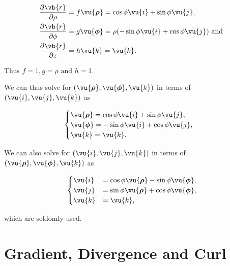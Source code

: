 \documentclass[english,a4paper,12pt]{report}
\begin{document}
\begin{equation}
	\begin{aligned} 
		\frac{\partial \vb{r} }{\partial \rho }  &= f \vu{\boldsymbol{\rho } } = \cos{\phi}\vu{i} + \sin{\phi}\vu{j}, \\
		\frac{\partial \vb{r} }{\partial \phi }  &= g \vu{\boldsymbol{\phi } } = \rho (-\sin{\phi}\vu{i} + \cos{\phi}\vu{j}) \text { and }  \\
		\frac{\partial \vb{r} }{\partial z }  &= h \vu{k} = \vu{k}. 
	\end{aligned} 
\end{equation}

Thus \(f = 1, g = \rho  \text { and }  h = 1\). 

We can thus solve for \((\vu{\boldsymbol{\rho } }, \vu{\boldsymbol{\phi } }, \vu{k} )\) in terms of \((\vu{i} ,\vu{j} ,\vu{k} )\) as

\begin{equation}
    \begin{cases} 
        \vu{\boldsymbol{\rho } } = \cos \phi \vu{i} + \sin \phi \vu{j}, \\
        \vu{\boldsymbol{\phi } } = -\sin \phi \vu{i} + \cos \phi \vu{j}, \\
        \vu{k} = \vu{k}.
        \end{cases}
\end{equation}



We can also solve for \((\vu{i} , \vu{j}, \vu{k} )\) in terms of \((\vu{\boldsymbol{\rho } }, \vu{\boldsymbol{\phi } }, \vu{k} )\) as  

\begin{equation}
    \begin{cases}
        \vu{i} &= \cos \phi  \vu{\boldsymbol{\rho } } - \sin \phi \vu{\boldsymbol{\phi } }, \\
        \vu{j} &= \sin \phi \vu{\boldsymbol{\rho } } + \cos \phi \vu{\boldsymbol{\phi } }, \\
        \vu{k} &= \vu{k},
        \end{cases}
\end{equation}

which are seldomly used.











\section{Gradient, Divergence and Curl} 
\end{document}
